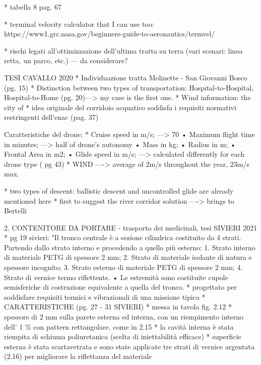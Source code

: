 * tabella 8 pag. 67 

* terminal velocity calculator that I can use too: https://www1.grc.nasa.gov/beginners-guide-to-aeronautics/termvel/

* rischi legati all'ottimizzazione dell'ultima tratta su terra (vari scenari: linea retta, un parco, etc.) --- da considerare?





TESI CAVALLO 2020
* Individuazione tratta Molinette - San Giovanni Bosco (pg. 15)
* Distinction between two types of transportation: Hospital-to-Hospital, Hospital-to-Home (pg. 20)---> my case is the first one. 
* Wind information: the city of 
* idea originale del corridoio acquatico soddisfa i requisiti normativi restringenti dell'enac (pag. 37)

Caratteristiche del drone: 
* Cruise speed in m/s; ---> 70%
• Maximum flight time in minutes; ---> half of drone's autonomy
• Mass in kg; 
• Radius in m; 
• Frontal Area in m2; 
• Glide speed in m/s; ---> calculated differently for each drone type ( pg 43)
* WIND ----> average of 2m/s throughout the year, 23m/s max. 


* two types of descent: ballistic descent and uncontrolled glide are already mentioned here
* first to suggest the river corridor solution ----> brings to Bertelli





2. CONTENITORE DA PORTARE - trasporto dei medicinali, tesi SIVIERI 2021
* pg 19 sivieri: "Il tronco centrale è a sezione cilindrica costituito da 4 strati. Partendo dallo strato interno e procedendo a quello più esterno:
                    1. Strato interno di materiale PETG di spessore 2 mm;
                    2. Strato di materiale isolante di natura e spessore incognito;
                    3. Strato esterno di materiale PETG di spessore 2 mm;
                    4. Strato di vernice termo riflettente.
                    • Le estremità sono costituite cupole semisferiche di costruzione equivalente a quella del tronco.
* progettato per soddisfare requisiti termici e vibrazionali di una missione tipica
* CARATTERISTICHE (pg. 27 - 31 SIVIERI)
    * messa in tavola fig. 2.12
    *  spessore di 2 mm sulla parete esterna ed interna, con un riempimento interno dell’ 1 \% con pattern rettangolare, come in 2.15
    *  la cavità interna è stata riempita di schiuma poliuretanica (scelta di iniettabilità efficace)
    * superficie esterna è stata scartavetrata e sono state applicate tre strati di vernice argentata (2.16) per migliorare la riflettanza del materiale

